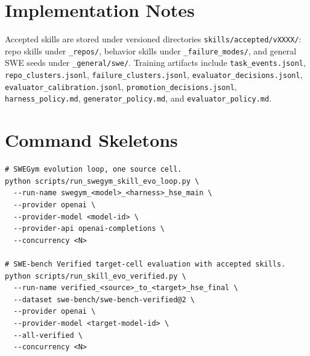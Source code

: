 \section{Implementation Notes}

Accepted skills are stored under versioned directories
\texttt{skills/accepted/vXXXX/}: repo skills under \texttt{\_repos/}, behavior
skills under \texttt{\_failure\_modes/}, and general SWE seeds under
\texttt{\_general/swe/}. Training artifacts include \texttt{task\_events.jsonl},
\texttt{repo\_clusters.jsonl}, \texttt{failure\_clusters.jsonl},
\texttt{evaluator\_decisions.jsonl}, \texttt{evaluator\_calibration.jsonl},
\texttt{promotion\_decisions.jsonl}, \texttt{harness\_policy.md},
\texttt{generator\_policy.md}, and \texttt{evaluator\_policy.md}.

\section{Command Skeletons}

\begin{verbatim}
# SWEGym evolution loop, one source cell.
python scripts/run_swegym_skill_evo_loop.py \
  --run-name swegym_<model>_<harness>_hse_main \
  --provider openai \
  --provider-model <model-id> \
  --provider-api openai-completions \
  --concurrency <N>

# SWE-bench Verified target-cell evaluation with accepted skills.
python scripts/run_skill_evo_verified.py \
  --run-name verified_<source>_to_<target>_hse_final \
  --dataset swe-bench/swe-bench-verified@2 \
  --provider openai \
  --provider-model <target-model-id> \
  --all-verified \
  --concurrency <N>
\end{verbatim}
